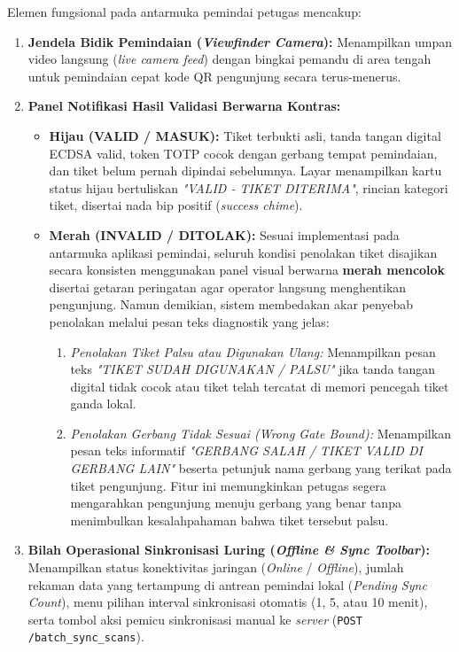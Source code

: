 Elemen fungsional pada antarmuka pemindai petugas mencakup:
\begin{enumerate}
    \item \textbf{Jendela Bidik Pemindaian (\textit{Viewfinder Camera}):} Menampilkan umpan video langsung (\textit{live camera feed}) dengan bingkai pemandu di area tengah untuk pemindaian cepat kode QR pengunjung secara terus-menerus.
    \item \textbf{Panel Notifikasi Hasil Validasi Berwarna Kontras:}
    \begin{itemize}
        \item \textbf{Hijau (VALID / MASUK):} Tiket terbukti asli, tanda tangan digital ECDSA valid, token TOTP cocok dengan gerbang tempat pemindaian, dan tiket belum pernah dipindai sebelumnya. Layar menampilkan kartu status hijau bertuliskan \textit{"VALID - TIKET DITERIMA"}, rincian kategori tiket, disertai nada bip positif (\textit{success chime}).
        \item \textbf{Merah (INVALID / DITOLAK):} Sesuai implementasi pada antarmuka aplikasi pemindai, seluruh kondisi penolakan tiket disajikan secara konsisten menggunakan panel visual berwarna \textbf{merah mencolok} disertai getaran peringatan agar operator langsung menghentikan pengunjung. Namun demikian, sistem membedakan akar penyebab penolakan melalui pesan teks diagnostik yang jelas:
        \begin{enumerate}
            \item \textit{Penolakan Tiket Palsu atau Digunakan Ulang:} Menampilkan pesan teks \textit{"TIKET SUDAH DIGUNAKAN / PALSU"} jika tanda tangan digital tidak cocok atau tiket telah tercatat di memori pencegah tiket ganda lokal.
            \item \textit{Penolakan Gerbang Tidak Sesuai (\textit{Wrong Gate Bound}):} Menampilkan pesan teks informatif \textit{"GERBANG SALAH / TIKET VALID DI GERBANG LAIN"} beserta petunjuk nama gerbang yang terikat pada tiket pengunjung. Fitur ini memungkinkan petugas segera mengarahkan pengunjung menuju gerbang yang benar tanpa menimbulkan kesalahpahaman bahwa tiket tersebut palsu.
        \end{enumerate}
    \end{itemize}
    \item \textbf{Bilah Operasional Sinkronisasi Luring (\textit{Offline \& Sync Toolbar}):} Menampilkan status konektivitas jaringan (\textit{Online} / \textit{Offline}), jumlah rekaman data yang tertampung di antrean pemindai lokal (\textit{Pending Sync Count}), menu pilihan interval sinkronisasi otomatis (1, 5, atau 10 menit), serta tombol aksi pemicu sinkronisasi manual ke \textit{server} (\texttt{POST /batch\_sync\_scans}).
\end{enumerate}
